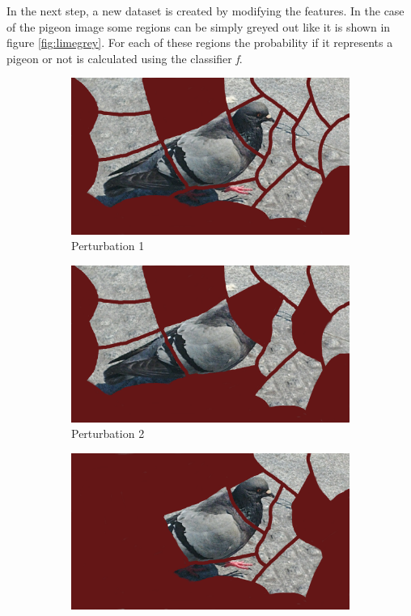 In the next step, a new dataset is created by modifying the features. In the case of the pigeon image some regions can be simply greyed out like it is shown in figure \ref{fig:limegrey}. For each of these regions the probability if it represents a pigeon or not is calculated using the classifier \textit{f}.

\begin{figure}[H]
    \centering
    \begin{subfigure}[t]{0.32\linewidth}
        \centering
        \includegraphics[width=\linewidth]{images/lime/pert1}
        \caption{Perturbation 1}
    \end{subfigure}
    \begin{subfigure}[t]{0.32\linewidth}
        \centering
        \includegraphics[width=\linewidth]{images/lime/pert2}
        \caption{Perturbation 2}
    \end{subfigure}
    \begin{subfigure}[t]{0.32\linewidth}
        \centering
        \includegraphics[width=\linewidth]{images/lime/pert3}

\end{subfigure}
\end{figure}
